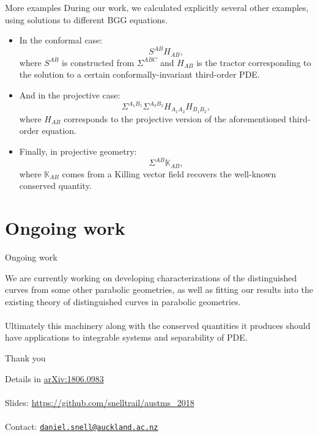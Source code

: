 \documentclass[handout]{beamer}
\begin{document}
\begin{frame}{More examples}
  During our work, we calculated explicitly several other examples, using
  solutions to different BGG equations.\\
  \begin{itemize}
    \pause
    \item In the conformal case:
      \[
      S^{AB} H_{AB},
      \]
      where \( S^{AB} \) is constructed from \( \Sigma^{ABC} \) and
      \( H_{AB} \) is the tractor corresponding to the solution to a certain
      conformally-invariant third-order PDE.
    \pause
    \item And in the projective case:
      \[
        \Sigma^{A_1 B_1} \Sigma^{A_2 B_2} H_{A_1
        A_2} H_{B_1 B_2},
      \]
      where \( H_{A B} \) corresponds to the projective version of the
      aforementioned third-order equation.\\
      \pause
    \item Finally, in projective geometry:
      \[
        \Sigma^{A B} \mathbb{K}_{A B},
      \]
      where \( \mathbb{K}_{A B} \) comes from a Killing vector field recovers the well-known conserved quantity.
  \end{itemize}
\end{frame}

\section{Ongoing work}

\begin{frame}{Ongoing work}
  \begin{block}{}
    We are currently working on developing characterizations of the distinguished curves from some other parabolic geometries, as well as fitting our results into the existing theory of distinguished curves in parabolic geometries. \\
    \hspace{1em}\\
    \pause
    Ultimately this machinery along with the conserved quantities it produces should have applications to integrable systems and separability of PDE.
  \end{block}
\end{frame}

\begin{frame}{Thank you}
  \begin{block}{}
  Details in \href{https://arxiv.org/abs/1806.09830}{arXiv:1806.0983}\\
  \hspace{1em}\\
  Slides: \href{https://github.com/snelltrail/austms_2018}{https://github.com/snelltrail/austms\_2018}\\
  \hspace{1em}\\
  Contact: \texttt{\href{mailto:daniel.snell@auckland.ac.nz}{daniel.snell@auckland.ac.nz}}
  \end{block}
\end{frame}



\end{document}
